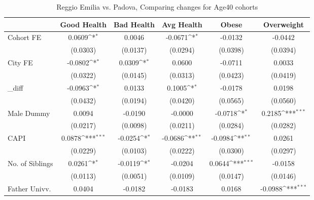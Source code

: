 \begin{table}[htbp]\centering
\def\sym#1{\ifmmode^{#1}\else\(^{#1}\)\fi}
\caption{Reggio Emilia vs. Padova, Comparing changes for Age40 cohorts}
\begin{tabular}{l*{5}{c}}
\toprule
            &\multicolumn{1}{c}{Good Health}&\multicolumn{1}{c}{Bad Health}&\multicolumn{1}{c}{Avg Health}&\multicolumn{1}{c}{Obese}&\multicolumn{1}{c}{Overweight}\\
\midrule
Cohort FE   &      0.0609\sym{*}  &      0.0046         &     -0.0671\sym{*}  &     -0.0132         &     -0.0442         \\
            &    (0.0303)         &    (0.0137)         &    (0.0294)         &    (0.0398)         &    (0.0394)         \\
\addlinespace
City FE     &     -0.0802\sym{*}  &      0.0309\sym{*}  &      0.0600         &     -0.0711         &      0.0033         \\
            &    (0.0322)         &    (0.0145)         &    (0.0313)         &    (0.0423)         &    (0.0419)         \\
\addlinespace
\_diff       &     -0.0963\sym{*}  &      0.0133         &      0.1005\sym{*}  &     -0.0178         &      0.0198         \\
            &    (0.0432)         &    (0.0194)         &    (0.0420)         &    (0.0565)         &    (0.0560)         \\
\addlinespace
Male Dummy  &      0.0094         &     -0.0190         &     -0.0000         &     -0.0718\sym{*}  &      0.2185\sym{***}\\
            &    (0.0217)         &    (0.0098)         &    (0.0211)         &    (0.0284)         &    (0.0282)         \\
\addlinespace
CAPI        &      0.0878\sym{***}&     -0.0254\sym{*}  &     -0.0686\sym{**} &     -0.0984\sym{**} &      0.0261         \\
            &    (0.0229)         &    (0.0103)         &    (0.0222)         &    (0.0300)         &    (0.0297)         \\
\addlinespace
No. of Siblings&      0.0261\sym{*}  &     -0.0119\sym{*}  &     -0.0204         &      0.0644\sym{***}&     -0.0158         \\
            &    (0.0113)         &    (0.0051)         &    (0.0109)         &    (0.0147)         &    (0.0146)         \\
\addlinespace
Father Univv.&      0.0404         &     -0.0182         &     -0.0183         &      0.0168         &     -0.0988\sym{***}\\

\end{tabular}
\end{table}
